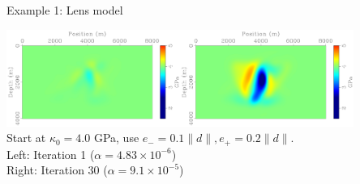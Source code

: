 \documentclass[xcolor=dvipsnames,12pt,aspectratio=169]{beamer}
\begin{document}
\begin{frame}
\begin{center}
Example 1: Lens model
\end{center}
\begin{center}
\includegraphics[height=1.25in]{Fig/cgw1bulkupdlh0.pdf}\includegraphics[height=1.25in]{Fig/cgw30bulkupdlh0.pdf}\\
\vspace{0.25in}
Start at $\kappa_0=4.0$ GPa, use $e_-=0.1\|d\|, e_+=0.2\|d\|$. \\
Left: Iteration 1 ($\alpha=4.83 \times 10^{-6}$)\\
Right: Iteration 30 ($\alpha = 9.1\times 10^{-5}$)
\end{center}
\end{frame}
\end{document}
